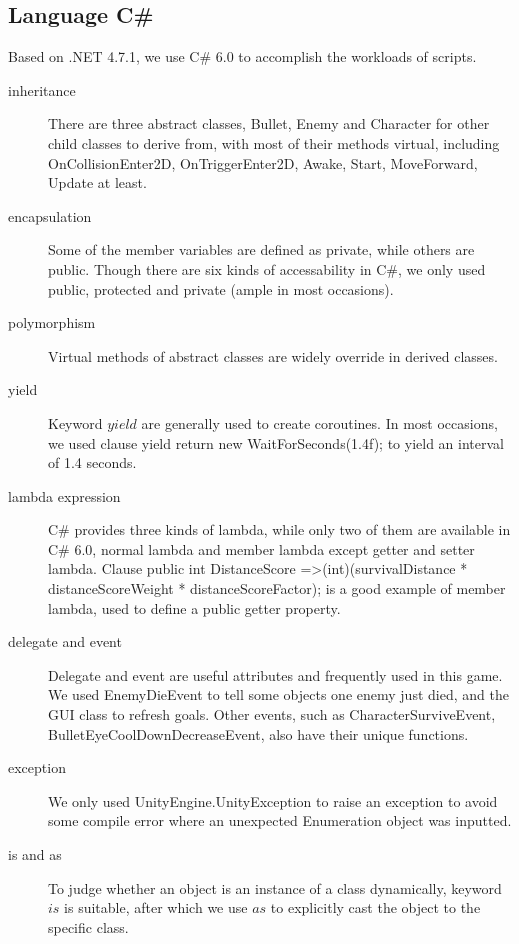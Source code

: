 \documentclass{article}
\begin{document}
\subsection{Language C\#}
Based on .NET 4.7.1, we use C\# 6.0 to accomplish the workloads of scripts.
\begin{description}
\item[inheritance] There are three abstract classes, Bullet, Enemy and Character for other child classes to derive from, with most of their methods virtual, including On\-Collision\-Enter2D, On\-Trigger\-Enter2D, Awake, Start, Move\-Forward, Update at least.
\item[encapsulation] Some of the member variables are defined as private, while others are public. Though there are six kinds of accessability in C\#, we only used public, protected and private (ample in most occasions).
\item[polymorphism] Virtual methods of abstract classes are widely override in derived classes.
\item[yield] Keyword $yield$ are generally used to create coroutines. In most occasions, we used clause
yield return new Wait\-For\-Seconds(1.4f);
to yield an interval of 1.4 seconds.
\item[lambda expression] C\# provides three kinds of lambda, while only two of them are available in C\# 6.0, normal lambda and member lambda except getter and setter lambda. Clause
public int Distance\-Score =\textgreater (int)(survival\-Distance * distance\-Score\-Weight * distance\-Score\-Factor);
is a good example of member lambda, used to define a public getter property.
\item[delegate and event] Delegate and event are useful attributes and frequently used in this game. We used Enemy\-Die\-Event to tell some objects one enemy just died, and the GUI class to refresh goals. Other events, such as Character\-Survive\-Event, Bullet\-Eye\-Cool\-Down\-Decrease\-Event, also have their unique functions.
\item[exception] We only used Unity\-Engine.Unity\-Exception to raise an exception to avoid some compile error where an unexpected Enumeration object was inputted.
\item[is and as] To judge whether an object is an instance of a class dynamically, keyword $is$ is suitable, after which we use $as$ to explicitly cast the object to the specific class.
\end{description}
\end{document}
